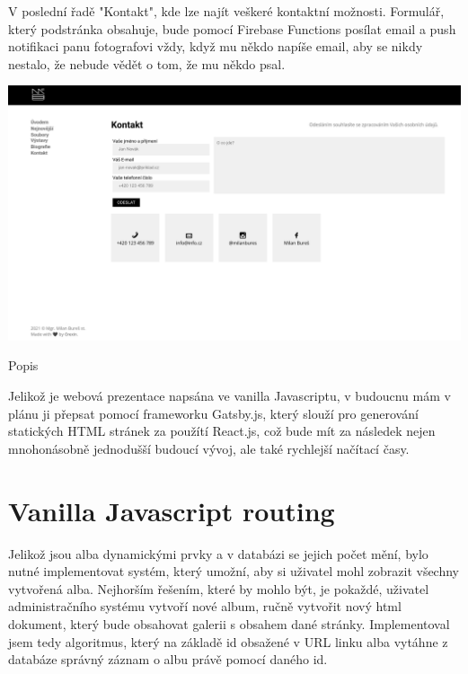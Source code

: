 \documentclass[12pt,a4paper]{report}
\begin{document}
  V poslední řadě "Kontakt", kde lze najít veškeré kontaktní možnosti. Formulář, který podstránka
  obsahuje, bude pomocí Firebase Functions posílat email a push notifikaci panu fotografovi vždy,
  když mu někdo napíše email, aby se nikdy nestalo, že nebude vědět o tom, že mu někdo psal.

  \vspace*{0.5cm}
  \noindent\includegraphics[width=\linewidth]{contact.png}
  \begin{center}
    Popis
  \end{center}
  \vspace*{0.5cm}

  Jelikož je webová prezentace napsána ve vanilla Javascriptu, v budoucnu mám v plánu ji přepsat
  pomocí frameworku Gatsby.js, který slouží pro generování statických HTML stránek za použítí
  React.js, což bude mít za následek nejen mnohonásobně jednodušší budoucí vývoj, ale také
  rychlejší načítací časy.

  \section{Vanilla Javascript routing}
  Jelikož jsou alba dynamickými prvky a v databázi se jejich počet mění, bylo nutné implementovat systém, který
  umožní, aby si uživatel mohl zobrazit všechny vytvořená alba. Nejhorším řešením, které by mohlo být,
  je pokaždé, uživatel administračního systému vytvoří nové album, ručně vytvořit nový html dokument, který bude 
  obsahovat galerii s obsahem dané stránky. Implementoval jsem tedy algoritmus, který na základě id obsažené v URL linku alba vytáhne z
  databáze správný záznam o albu právě pomocí daného id.
\end{document}
